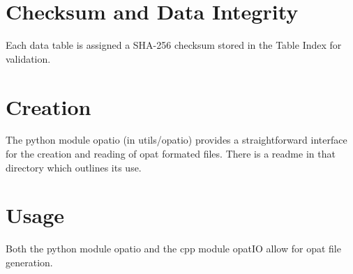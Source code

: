 \documentclass{article}
\begin{document}
\section{Checksum and Data Integrity}
Each data table is assigned a SHA-256 checksum stored in the Table Index for validation.

\section{Creation}
The python module opatio (in utils/opatio) provides
a straightforward interface for the creation and reading of opat formated
files. There is a readme in that directory which outlines its use.  

\section{Usage}
Both the python module opatio and the cpp module opatIO allow for opat file generation.
\end{document}
